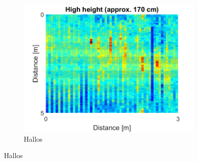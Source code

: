 \begin{minipage}{0.9\textwidth}
\begin{figure}[H]
\begin{subfigure}[b]{0.326\textwidth}
\includegraphics[width=\textwidth]{figures/Not_Norm_space_3.png}
\caption{Hallos}
\label{3}
\end{subfigure}
\captionsetup{belowskip=-1.5em}
\caption{Hallos}
\label{3}
\end{figure}
\end{minipage}%
